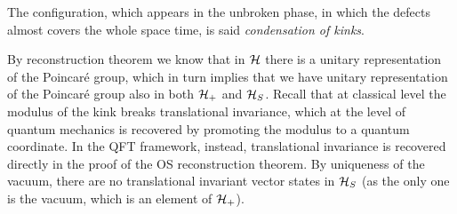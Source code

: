 \documentclass[../main/main.tex]{subfiles}
\begin{document}
The configuration, which appears in the unbroken phase, in which the defects almost covers the whole space time, is said \emph{condensation of kinks}. 

\skipline

By reconstruction theorem we know that in $\mathcal H$ there is a unitary representation of the Poincaré group, which in turn implies that we have unitary representation of the Poincaré group also in both $\mathcal H_+$ and $\mathcal H_S$.  Recall that at classical level the modulus of the kink breaks translational invariance, which at the level of quantum mechanics is recovered by promoting the modulus to a quantum coordinate. In the QFT framework, instead, translational invariance is recovered directly in the proof of the OS reconstruction theorem.
By uniqueness of the vacuum, there are no translational invariant vector states in $\mathcal H_S$ (as the only one is the vacuum, which is an element of $\mathcal H_+$). 
\end{document}
